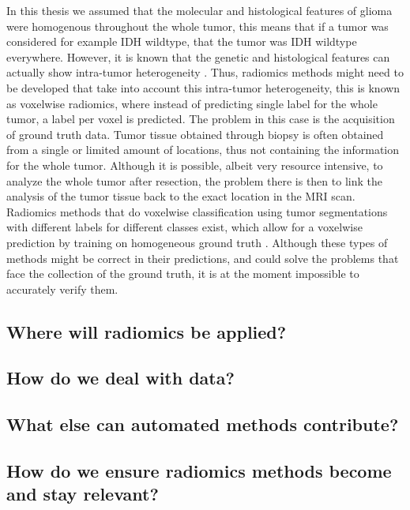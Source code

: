 In this thesis we assumed that the molecular and histological features of glioma were homogenous throughout the whole \gls{tumor}, this means that if a \gls{tumor} was considered for example \gls{IDH} wildtype, that the \gls{tumor} was \gls{IDH} wildtype everywhere.
However, it is known that the genetic and histological features can actually show intra-tumor heterogeneity \autocite{eder2014heterogeneity}.
Thus, radiomics methods might need to be developed that take into account this intra-tumor heterogeneity, this is known as voxelwise radiomics, where instead of predicting single label for the whole \gls{tumor}, a label per voxel is predicted.
The problem in this case is the acquisition of ground truth data.
Tumor tissue obtained through biopsy is often obtained from a single or limited amount of locations, thus not containing the information for the whole \gls{tumor}.
Although it is possible, albeit very resource intensive, to analyze the whole \gls{tumor} after resection, the problem there is then to link the analysis of the \gls{tumor} tissue back to the exact location in the \gls{MRI} scan.
Radiomics methods that do voxelwise classification using \gls{tumor} segmentations with different labels for different classes exist, which allow for a voxelwise prediction by training on homogeneous ground truth \autocite{yogananda20201p19q}.
Although these types of methods might be correct in their predictions, and could solve the problems that face the collection of the ground truth, it is at the moment impossible to accurately verify them.

\subsection{Where will radiomics be applied?}

\subsection{How do we deal with data?}

\subsection{What else can automated methods contribute?}

\subsection{How do we ensure radiomics methods become and stay relevant?}

